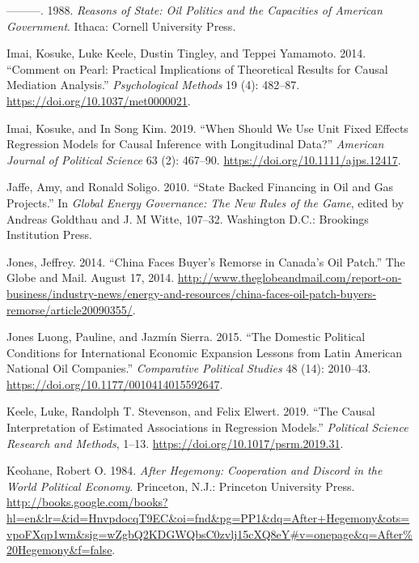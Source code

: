 \documentclass[11pt,]{book}
\begin{document}
\leavevmode\hypertarget{ref-ikenberry_reasons_1988}{}%
---------. 1988. \emph{Reasons of State: Oil Politics and the Capacities of American Government}. Ithaca: Cornell University Press.

\leavevmode\hypertarget{ref-imai_comment_2014-1}{}%
Imai, Kosuke, Luke Keele, Dustin Tingley, and Teppei Yamamoto. 2014. ``Comment on Pearl: Practical Implications of Theoretical Results for Causal Mediation Analysis.'' \emph{Psychological Methods} 19 (4): 482--87. \url{https://doi.org/10.1037/met0000021}.

\leavevmode\hypertarget{ref-imai_when_2019}{}%
Imai, Kosuke, and In Song Kim. 2019. ``When Should We Use Unit Fixed Effects Regression Models for Causal Inference with Longitudinal Data?'' \emph{American Journal of Political Science} 63 (2): 467--90. \url{https://doi.org/10.1111/ajps.12417}.

\leavevmode\hypertarget{ref-jaffe_state_2010}{}%
Jaffe, Amy, and Ronald Soligo. 2010. ``State Backed Financing in Oil and Gas Projects.'' In \emph{Global Energy Governance: The New Rules of the Game}, edited by Andreas Goldthau and J. M Witte, 107--32. Washington D.C.: Brookings Institution Press.

\leavevmode\hypertarget{ref-jones_china_2014}{}%
Jones, Jeffrey. 2014. ``China Faces Buyer's Remorse in Canada's Oil Patch.'' The Globe and Mail. August 17, 2014. \url{http://www.theglobeandmail.com/report-on-business/industry-news/energy-and-resources/china-faces-oil-patch-buyers-remorse/article20090355/}.

\leavevmode\hypertarget{ref-jones_luong_domestic_2015}{}%
Jones Luong, Pauline, and Jazmín Sierra. 2015. ``The Domestic Political Conditions for International Economic Expansion Lessons from Latin American National Oil Companies.'' \emph{Comparative Political Studies} 48 (14): 2010--43. \url{https://doi.org/10.1177/0010414015592647}.

\leavevmode\hypertarget{ref-keele_causal_2019}{}%
Keele, Luke, Randolph T. Stevenson, and Felix Elwert. 2019. ``The Causal Interpretation of Estimated Associations in Regression Models.'' \emph{Political Science Research and Methods}, 1--13. \url{https://doi.org/10.1017/psrm.2019.31}.

\leavevmode\hypertarget{ref-keohane_after_1984}{}%
Keohane, Robert O. 1984. \emph{After Hegemony: Cooperation and Discord in the World Political Economy}. Princeton, N.J.: Princeton University Press. \url{http://books.google.com/books?hl=en\&lr=\&id=HnvpdocqT9EC\&oi=fnd\&pg=PP1\&dq=After+Hegemony\&ots=vpoFXqp1wm\&sig=wZgbQ2KDGWQbsC0zvlj15cXQ8eY\#v=onepage\&q=After\%20Hegemony\&f=false}.
\end{document}
